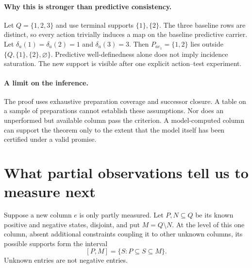\documentclass[11pt]{article}
\theoremstyle{remark}
\begin{document}
\paragraph{Why this is stronger than predictive consistency.}
Let $Q=\{1,2,3\}$ and use terminal supports $\{1\},\{2\}$. The three baseline rows are distinct, so every action trivially induces a map on the baseline predictive carrier. Let $\delta_a(1)=\delta_a(2)=1$ and $\delta_a(3)=3$. Then $P_{ae_1}=\{1,2\}$ lies outside $\{Q,\{1\},\{2\},\varnothing\}$. Predictive well-definedness alone does not imply incidence saturation. The new support is visible after one explicit action--test experiment.

\paragraph{A limit on the inference.}
The proof uses exhaustive preparation coverage and successor closure. A table on a sample of preparations cannot establish these assumptions. Nor does an unperformed but available column pass the criterion. A model-computed column can support the theorem only to the extent that the model itself has been certified under a valid promise.

\section{What partial observations tell us to measure next}
\label{sec:partial}

Suppose a new column $e$ is only partly measured. Let $P,N\subseteq Q$ be its known positive and negative states, disjoint, and put $M=Q\setminus N$. At the level of this one column, absent additional constraints coupling it to other unknown columns, its possible supports form the interval
\[
 [P,M]=\{S:P\subseteq S\subseteq M\}.
\]
Unknown entries are not negative entries.
\end{document}
